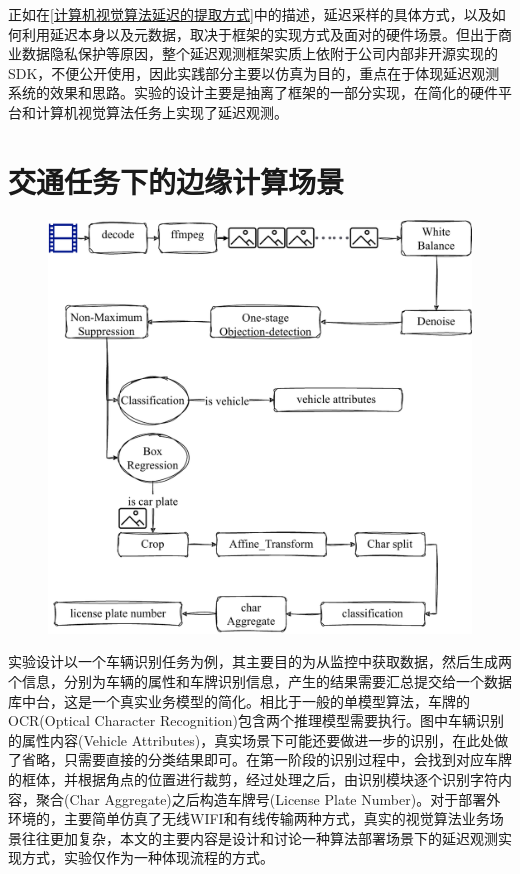 \documentclass[master]{shtthesis}
\begin{document}
正如在\ref{计算机视觉算法延迟的提取方式}中的描述，延迟采样的具体方式，以及如何利用延迟本身以及元数据，取决于框架的实现方式及面对的硬件场景。但出于商业数据隐私保护等原因，整个延迟观测框架实质上依附于公司内部非开源实现的SDK，不便公开使用，因此实践部分主要以仿真为目的，重点在于体现延迟观测系统的效果和思路。实验的设计主要是抽离了框架的一部分实现，在简化的硬件平台和计算机视觉算法任务上实现了延迟观测。

\section{交通任务下的边缘计算场景}
\begin{figure}[htbp]
	\centering
	\includegraphics[width=12cm]{img/exp.pdf}
	\label{简化的车牌识别流程}
\end{figure}
实验设计以一个车辆识别任务为例，其主要目的为从监控中获取数据，然后生成两个信息，分别为车辆的属性和车牌识别信息，产生的结果需要汇总提交给一个数据库中台，这是一个真实业务模型的简化。相比于一般的单模型算法，车牌的OCR(Optical Character Recognition)包含两个推理模型需要执行。图中车辆识别的属性内容(Vehicle Attributes)，真实场景下可能还要做进一步的识别，在此处做了省略，只需要直接的分类结果即可。在第一阶段的识别过程中，会找到对应车牌的框体，并根据角点的位置进行裁剪，经过处理之后，由识别模块逐个识别字符内容，聚合(Char Aggregate)之后构造车牌号(License Plate Number)。对于部署外环境的，主要简单仿真了无线WIFI和有线传输两种方式，真实的视觉算法业务场景往往更加复杂，本文的主要内容是设计和讨论一种算法部署场景下的延迟观测实现方式，实验仅作为一种体现流程的方式。
\end{document}
